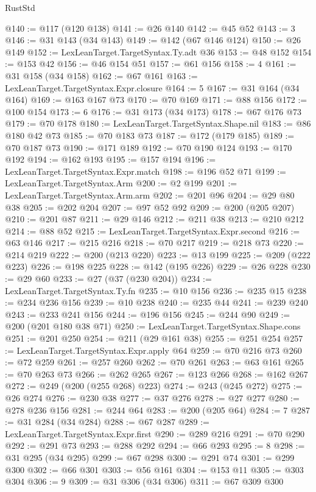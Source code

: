\begin{lexlean}{RustStd}
\begin{coremodule}
{\begin{coremodule}
{{{{{{{{{{{{{{{{@140 := @117 (@120 @138)
@141 := @26 @140
@142 := @45 @52
@143 := 3
@146 := @31 @143 (@34 @143)
@149 := @142 (@67 @146 @124)
@150 := @26 @149
@152 := LexLeanTarget.TargetSyntax.Ty.adt @36
@153 := @48 @152
@154 := @153 @42
@156 := @46 @154 @51
@157 := @61 @156
@158 := 4
@161 := @31 @158 (@34 @158)
@162 := @67 @161
@163 := LexLeanTarget.TargetSyntax.Expr.closure
@164 := 5
@167 := @31 @164 (@34 @164)
@169 := @163 @167 @73
@170 := @70 @169
@171 := @88 @156
@172 := @100 @154
@173 := 6
@176 := @31 @173 (@34 @173)
@178 := @67 @176 @73
@179 := @70 @178
@180 := LexLeanTarget.TargetSyntax.Shape.nil
@183 := @86 @180 @42 @73
@185 := @70 @183 @73
@187 := @172 (@179 @185)
@189 := @70 @187 @73
@190 := @171 @189
@192 := @70 @190 @124
@193 := @170 @192
@194 := @162 @193
@195 := @157 @194
@196 := LexLeanTarget.TargetSyntax.Expr.match
@198 := @196 @52 @71
@199 := LexLeanTarget.TargetSyntax.Arm
@200 := @2 @199
@201 := LexLeanTarget.TargetSyntax.Arm.arm
@202 := @201 @96
@204 := @29 @80 @38
@205 := @202 @204
@207 := @97 @52 @92
@209 := @200 (@205 @207)
@210 := @201 @87
@211 := @29 @146
@212 := @211 @38
@213 := @210 @212
@214 := @88 @52
@215 := LexLeanTarget.TargetSyntax.Expr.second
@216 := @63 @146
@217 := @215 @216
@218 := @70 @217
@219 := @218 @73
@220 := @214 @219
@222 := @200 (@213 @220)
@223 := @13 @199
@225 := @209 (@222 @223)
@226 := @198 @225
@228 := @142 (@195 @226)
@229 := @26 @228
@230 := @29 @60
@233 := @27 (@37 (@230 @204))
@234 := LexLeanTarget.TargetSyntax.Ty.fn
@235 := @10 @156
@236 := @235 @15
@238 := @234 @236 @156
@239 := @10 @238
@240 := @235 @44
@241 := @239 @240
@243 := @233 @241 @156
@244 := @196 @156
@245 := @244 @90
@249 := @200 (@201 @180 @38 @71)
@250 := LexLeanTarget.TargetSyntax.Shape.cons
@251 := @201 @250
@254 := @211 (@29 @161 @38)
@255 := @251 @254
@257 := LexLeanTarget.TargetSyntax.Expr.apply @64
@259 := @70 @216 @73
@260 := @72 @259
@261 := @257 @260
@262 := @70 @261
@263 := @63 @161
@265 := @70 @263 @73
@266 := @262 @265
@267 := @123 @266
@268 := @162 @267
@272 := @249 (@200 (@255 @268) @223)
@274 := @243 (@245 @272)
@275 := @26 @274
@276 := @230 @38
@277 := @37 @276
@278 := @27 @277
@280 := @278 @236 @156
@281 := @244 @64
@283 := @200 (@205 @64)
@284 := 7
@287 := @31 @284 (@34 @284)
@288 := @67 @287
@289 := LexLeanTarget.TargetSyntax.Expr.first
@290 := @289 @216
@291 := @70 @290
@292 := @291 @73
@293 := @288 @292
@294 := @66 @293
@295 := 8
@298 := @31 @295 (@34 @295)
@299 := @67 @298
@300 := @291 @74
@301 := @299 @300
@302 := @66 @301
@303 := @56 @161
@304 := @153 @11
@305 := @303 @304
@306 := 9
@309 := @31 @306 (@34 @306)
@311 := @67 @309 @300
}}}}}}}}}}}}}}}}
\end{coremodule}}
\end{coremodule}
\end{lexlean}
